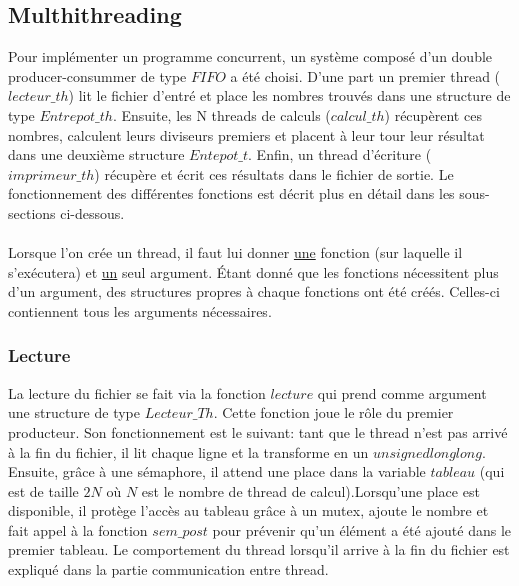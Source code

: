 \documentclass{article}
\begin{document}
\subsection{Multhithreading}
Pour implémenter un programme concurrent, un système composé d'un double producer-consummer de type $FIFO$ a été choisi. D'une part un premier thread ($lecteur\_th$) lit le fichier d'entré et place les nombres trouvés dans une structure de type $Entrepot\_th$. Ensuite, les N threads de calculs ($calcul\_th$) récupèrent ces nombres, calculent leurs diviseurs premiers et placent à leur tour leur résultat dans une deuxième structure $Entepot\_t$. Enfin, un thread d'écriture ($imprimeur\_th$) récupère et écrit ces résultats dans le fichier de sortie. Le fonctionnement des différentes fonctions est décrit plus en détail dans les sous-sections ci-dessous.\\ 
\\ \danger Lorsque l'on crée un thread, il faut lui donner \underline{une} fonction (sur laquelle il s'exécutera) et \underline{un} seul argument. Étant donné que les fonctions nécessitent plus d'un argument, des structures propres à chaque fonctions ont été créés. Celles-ci contiennent tous les arguments nécessaires.

\subsubsection{Lecture}
La lecture du fichier se fait via la fonction $lecture$ qui prend comme argument une structure de type $Lecteur\_Th$. Cette fonction joue le rôle du premier producteur. Son fonctionnement est le suivant: tant que le thread n'est pas arrivé à la fin du fichier, il lit chaque ligne et la transforme en un $unsigned long long$. Ensuite, grâce à une sémaphore, il attend une place dans la variable $tableau$ (qui est de taille $2N$ où $N$ est le nombre de thread de calcul).Lorsqu'une place est disponible, il protège l'accès au tableau grâce à un mutex, ajoute le nombre et fait appel à la fonction $sem\_post$ pour prévenir qu'un élément a été ajouté dans le premier tableau.
Le comportement du thread lorsqu'il arrive à la fin du fichier est expliqué dans la partie communication entre thread.
\end{document}
